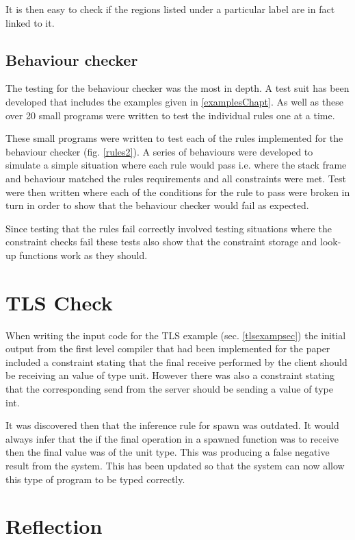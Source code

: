 It is then easy to check if the regions listed under a particular label are in fact linked to it. 

\subsection{Behaviour checker}

The testing for the behaviour checker was the most in depth. A test suit has been developed that includes the examples given in \ref{examplesChapt}. As well as these over 20 small programs were written to test the individual rules one at a time. 

These small programs were written to test each of the rules implemented for the behaviour checker (fig. \ref{rules2}). A series of behaviours were developed to simulate a simple situation where each rule would pass i.e. where the stack frame and behaviour matched the rules requirements and all constraints were met. Test were then written where each of the conditions for the rule to pass were broken in turn in order to show that the behaviour checker would fail as expected. 

Since testing that the rules fail correctly involved testing situations where the constraint checks fail these tests also show that the constraint storage and look-up functions work as they should.

\section{TLS Check}
\label{bug}

When writing the input code for the TLS example (sec. \ref{tlsexampsec}) the initial output from the first level compiler that had been implemented for the paper \cite{paper1} included a constraint stating that the final receive performed by the client should be receiving an value of type unit. However there was also a constraint stating that the corresponding send from the server should be sending a value of type int. 

It was discovered then that the inference rule for spawn was outdated. It would always infer that the if the final operation in a spawned function was to receive then the final value was of the unit type. This was producing a false negative result from the system. This has been updated so that the system can now allow this type of program to be typed correctly.

\section{Reflection}

